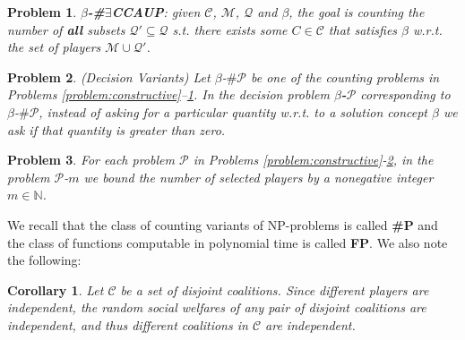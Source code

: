 \documentclass[letterpaper]{article}
\newtheorem{problem}{Problem}
\newtheorem{corollary}{Corollary}
\begin{document}
\begin{problem}
\label{problem:exists-CCAUP}
{\normalfont \textbf{$\beta$-\#$\exists$CCAUP}:} given $\mathcal{C}$, $\mathcal{M}$, $\mathcal{Q}$ and $\beta$, the goal is counting the number of \textbf{all} subsets $\mathcal{Q}' \subseteq \mathcal{Q}$ s.t. there exists some $C \in \mathcal{C}$ that satisfies $\beta$ w.r.t. the set of players $\mathcal{M} \cup \mathcal{Q}'$.
\end{problem}
\begin{problem}
\label{problem:Decision}
{\normalfont (Decision Variants)}
Let {\normalfont $\beta$-$\# \mathcal{P}$} be one of the counting problems in Problems \ref{problem:constructive}--\ref{problem:exists-CCAUP}. In the decision problem {\normalfont \textbf{$\beta$-$\mathcal{P}$}} corresponding to {\normalfont $\beta$-$\#\mathcal{P}$}, instead of asking for a particular quantity w.r.t. to a solution concept $\beta$ we ask if that quantity is greater than zero.
\end{problem}
\begin{problem}
\label{problem:bounded}
For each problem {\normalfont $\mathcal{P}$} in Problems \ref{problem:constructive}-\ref{problem:Decision}, in the problem {\normalfont $\mathcal{P}$-$m$} we bound the number of selected players by a nonegative integer $m \in \mathbb{N}$.
\end{problem}
We recall that the class of counting variants of NP-problems is called {\normalfont \textbf{\#P}} and the class of functions computable in polynomial time is called {\normalfont \textbf{FP}}. %
We also note the following:
\begin{corollary}
\label{corollary:independent}
Let $\mathcal{C}$ be a set of {\normalfont disjoint} coalitions. Since different players are independent, the random social welfares of any pair of \textit{disjoint} coalitions are independent, and thus different coalitions in $\mathcal{C}$ are independent.
\end{corollary}
\end{document}
